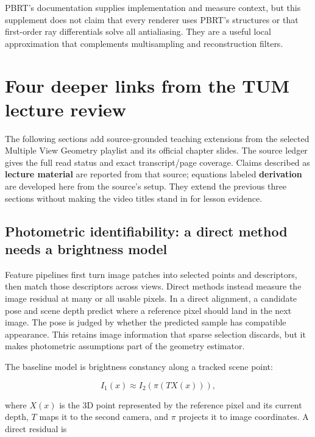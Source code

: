 PBRT's documentation supplies implementation and measure context, but this supplement does not claim that every renderer uses PBRT's structures or that first-order ray differentials solve all antialiasing. They are a useful local approximation that complements multisampling and reconstruction filters.

\section{Four deeper links from the TUM lecture review}\label{02-foundations-ii-ch036-four-deeper-links-from-the-tum-lecture-review}

The following sections add source-grounded teaching extensions from the selected Multiple View Geometry playlist and its official chapter slides. The source ledger gives the full read status and exact transcript/page coverage. Claims described as \textbf{lecture material} are reported from that source; equations labeled \textbf{derivation} are developed here from the source's setup. They extend the previous three sections without making the video titles stand in for lesson evidence.

\subsection{Photometric identifiability: a direct method needs a brightness model}\label{02-foundations-ii-ch036-photometric-identifiability-a-direct-method-needs-a-brightness-model}

Feature pipelines first turn image patches into selected points and descriptors, then match those descriptors across views. Direct methods instead measure the image residual at many or all usable pixels. In a direct alignment, a candidate pose and scene depth predict where a reference pixel should land in the next image. The pose is judged by whether the predicted sample has compatible appearance. This retains image information that sparse selection discards, but it makes photometric assumptions part of the geometry estimator.

The baseline model is brightness constancy along a tracked scene point:

\[
I_1(x) \approx I_2\!\left(\pi(TX(x))\right),
\]

where \(X(x)\) is the 3D point represented by the reference pixel and its current depth, \(T\) maps it to the second camera, and \(\pi\) projects it to image coordinates. A direct residual is

